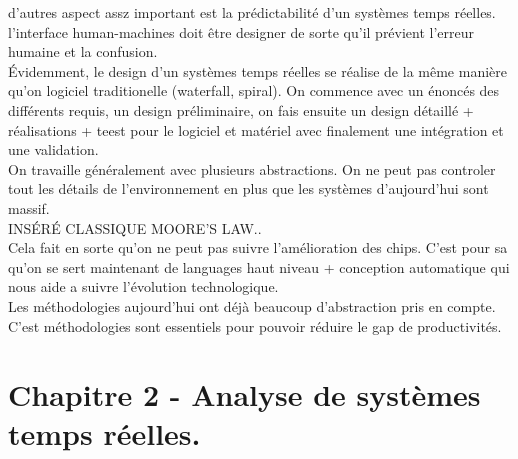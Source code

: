 \documentclass[oneside]{book}
\begin{document}
    d'autres aspect assz important est la prédictabilité d'un systèmes temps réelles. l'interface human-machines doit être designer de sorte qu'il prévient l'erreur humaine et la confusion.\\
    
    Évidemment, le design d'un systèmes temps réelles se réalise de la même manière qu'on logiciel traditionelle (waterfall, spiral). On commence avec un énoncés des différents requis, un design préliminaire, on fais ensuite un design détaillé + réalisations + teest pour le logiciel et matériel avec finalement une intégration et une validation.\\
    
    On travaille généralement avec plusieurs abstractions. On ne peut pas controler tout les détails de l'environnement en plus que les systèmes d'aujourd'hui sont massif.\\
    
    INSÉRÉ CLASSIQUE MOORE'S LAW..\\
    
    Cela fait en sorte qu'on ne peut pas suivre l'amélioration des chips. C'est pour sa qu'on se sert maintenant de languages haut niveau + conception automatique qui nous aide a suivre l'évolution technologique.\\
    
    Les méthodologies aujourd'hui ont déjà beaucoup d'abstraction pris en compte. C'est méthodologies sont essentiels pour pouvoir réduire le gap de productivités.\\
    
     
    \chapter{Chapitre 2 - Analyse de systèmes temps réelles.}
    
    
   
\end{document}

